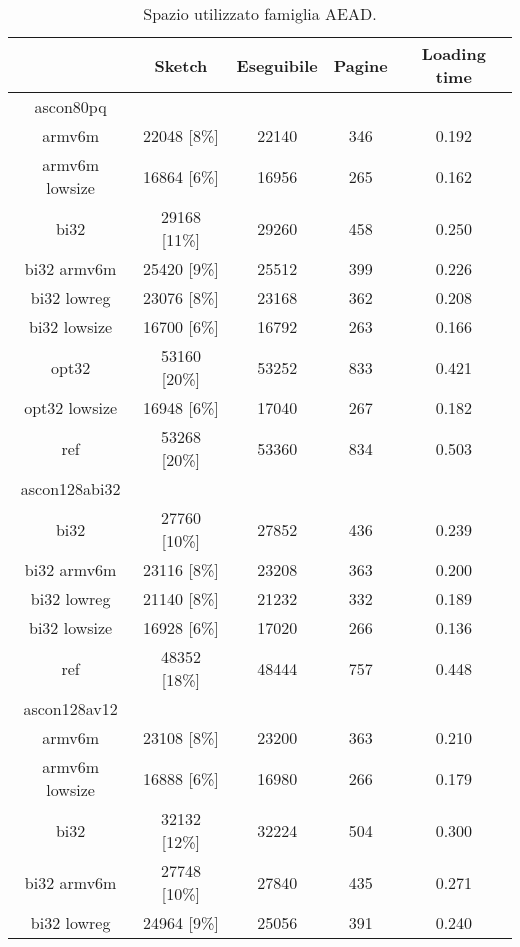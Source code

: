 \begin{table}[h]
    \caption{Spazio utilizzato famiglia AEAD.}
    \centering
	\begin{tabular}{|c|c|c|c|c|}
		\hline
         & Sketch & Eseguibile & Pagine & Loading time \\
        \hline
        ascon80pq & & & & \\
        \hline
        armv6m & 22048 [8\%] & 22140 & 346 & 0.192 \\
        \hline
        armv6m lowsize & 16864 [6\%] & 16956 & 265 & 0.162 \\
        \hline
        bi32 & 29168 [11\%] & 29260 & 458 & 0.250 \\
        \hline
        bi32 armv6m & 25420 [9\%] & 25512 & 399 & 0.226 \\
        \hline
        bi32 lowreg & 23076 [8\%] & 23168 & 362 & 0.208 \\
        \hline
        bi32 lowsize & 16700 [6\%] & 16792 & 263 & 0.166 \\
        \hline
        opt32 & 53160 [20\%] & 53252 & 833 & 0.421 \\
        \hline
        opt32 lowsize & 16948 [6\%] & 17040 & 267 & 0.182 \\
        \hline
        ref & 53268 [20\%] & 53360 & 834 & 0.503 \\
        \hline
        ascon128abi32 & & & & \\
        \hline  
        bi32 & 27760 [10\%] & 27852 & 436 & 0.239 \\
        \hline
        bi32 armv6m & 23116 [8\%] & 23208 & 363 & 0.200 \\
        \hline
        bi32 lowreg & 21140 [8\%] & 21232 & 332 & 0.189 \\
        \hline
        bi32 lowsize & 16928 [6\%] & 17020 & 266 & 0.136 \\
        \hline
        ref & 48352 [18\%] & 48444 & 757 & 0.448 \\
        \hline
        ascon128av12 & & & & \\
        \hline
        armv6m & 23108 [8\%] & 23200 & 363 & 0.210 \\
        \hline
        armv6m lowsize & 16888 [6\%] & 16980 & 266 & 0.179 \\
        \hline
        bi32 & 32132 [12\%] & 32224 & 504 & 0.300 \\
        \hline
        bi32 armv6m & 27748 [10\%] & 27840 & 435 & 0.271 \\
        \hline
        bi32 lowreg & 24964 [9\%] & 25056 & 391 & 0.240 \\

\end{tabular}
\end{table}
